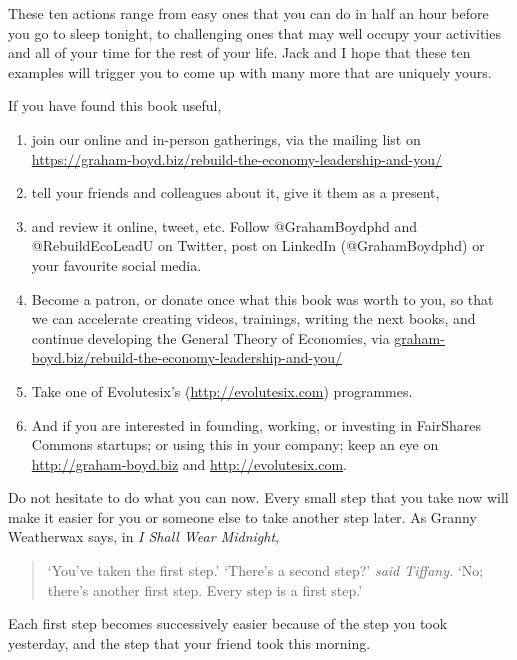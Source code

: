 These ten actions range from easy ones that you can do in half an hour before you go to sleep tonight, to challenging ones that may well occupy your activities and all of your time for the rest of your life. Jack and I hope that these ten examples will trigger you to come up with many more that are uniquely yours.


If you have found this book useful, 


\begin{enumerate}
\item join our online and in-person gatherings, via the mailing list on \url{https://graham-boyd.biz/rebuild-the-economy-leadership-and-you/} 
\item tell your friends and colleagues about it, give it them as a present, 
\item and review it online, tweet, etc. Follow @GrahamBoydphd and \newline @RebuildEcoLeadU on Twitter, post on LinkedIn (@GrahamBoydphd) or your favourite social media.
\item Become a patron, or donate once what this book was worth to you, so that we can accelerate creating videos, trainings, writing the next books, and continue developing the General Theory of Economies, via \url{graham-boyd.biz/rebuild-the-economy-leadership-and-you/} 
\item Take one of Evolutesix’s (\url{http://evolutesix.com}) programmes.
\item And if you are interested in founding, working, or investing in FairShares Commons startups; or using this in your company; keep an eye on \newline \url{http://graham-boyd.biz} and \url{http://evolutesix.com}.
\end{enumerate}


Do not hesitate to do what you can now. Every small step that you take now will make it easier for you or someone else to take another step later. As Granny Weatherwax says, in \emph{I Shall Wear Midnight}\cite{pratchett-wear-midnight}, 
\begin{quote}
‘You've taken the first step.’ \newline
‘There's a second step?’ \emph{said Tiffany.} \newline
‘No; there's another first step. Every step is a first step.’
\end{quote}
Each first step becomes successively easier because of the step you took yesterday, and the step that your friend took this morning. 


